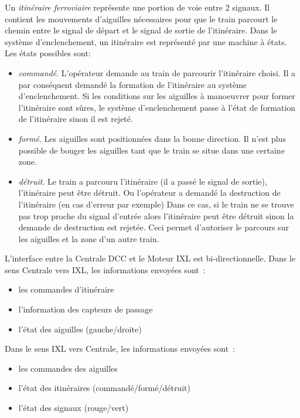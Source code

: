 \medskip
Un \emph{itinéraire ferroviaire} représente une portion de voie entre
2 signaux. Il contient les mouvements d’aiguilles nécessaires pour que
le train parcourt le chemin entre le signal de départ et le signal de
sortie de l'itinéraire. Dans le système d'enclenchement, un itinéraire
est représenté par une machine à états. Les états possibles sont:
\begin{itemize}
\item \emph{commandé}. L’opérateur demande au train de parcourir
  l’itinéraire choisi. Il a par conséquent demandé la formation de
  l’itinéraire au système d’enclenchement. Si les conditions sur les
  aiguilles à manoeuvrer pour former l’itinéraire sont sûres, le
  système d’enclenchement passe à l’état de formation de l’itinéraire
  sinon il est rejeté.
\item \emph{formé}. Les aiguilles sont positionnées dans la bonne
  direction. Il n’est plus possible de bouger les aiguilles tant que
  le train se situe dans une certaine zone.
\item \emph{détruit}. Le train a parcouru l’itinéraire (il a passé le
  signal de sortie), l'itinéraire peut être détruit. Ou l'opérateur a
  demandé la destruction de l'itinéraire (en cas d'erreur par exemple)
  Dans ce cas, si le train ne se trouve pas trop proche du signal
  d'entrée alors l'itinéraire peut être détruit sinon la demande de
  destruction est rejetée.  Ceci permet d'autoriser le parcours sur
  les aiguilles et la zone d’un autre train.
\end{itemize}


L'interface entre la Centrale DCC et le Moteur IXL est bi-directionnelle. 
Dans le sens Centrale vers IXL, les informations envoyées sont~:
\begin{itemize}
\item les commandes d'itinéraire
\item l'information des capteurs de passage
\item l'état des aiguilles (gauche/droite)
\end{itemize}

Dans le sens IXL vers Centrale, les informations envoyées sont~:
\begin{itemize}
\item les commandes des aiguilles
\item l'état des itinéraires (commandé/formé/détruit)
\item l'état des signaux (rouge/vert)
\end{itemize}

